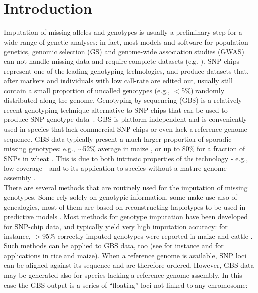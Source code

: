 \section{Introduction}
\label{intro}

Imputation of missing alleles and genotypes is usually a preliminary step for
a wide range of genetic analyses: in fact, most models and software for 
population genetics, genomic selection (GS) and genome-wide association 
studies (GWAS) can not handle missing data and require complete datasets (e.g. \cite{hayes2009invited}). 
SNP-chips represent one of the leading genotyping technologies, and produce 
datasets that, after markers and individuals with low call-rate are edited out, 
usually still contain a small proportion of uncalled genotypes (e.g., $<$5\%) 
randomly distributed along the genome. Genotyping-by-sequencing (GBS) is a 
relatively recent genotyping technique alternative to SNP-chips that can 
be used to produce SNP genotype data~\cite{elshire_robust_2011}.
GBS is platform-independent and is conveniently 
used in species that lack commercial SNP-chips or even lack a reference 
genome sequence. GBS data typically present a much larger proportion of 
sporadic missing genotypes: e.g., $\sim$52\% average in maize \cite{crossa_genomic_2013},
or up to 80\% for a fraction of SNPs in wheat \cite{poland_genomic_2012}. This 
is due to both intrinsic properties of the technology - e.g., low coverage - 
and to its application to species without a mature genome assembly \cite{glaubitz_tassel-gbs:_2014}.\\
There are several methods that are routinely used for the imputation of 
missing genotypes. Some rely solely on genotypic information, some make 
use also of genealogies, most of them are based on reconstructing haplotypes 
to be used in predictive models \cite{nicolazzi_software_2015}. Most methods for 
genotype imputation have been developed for SNP-chip data, and typically 
yield very high imputation accuracy: for instance, $>$95\% correctly imputed 
genotypes were reported in maize \cite{hickey_factors_2012} and cattle \cite{vanraden_genomic_2011}. 
Such methods can be applied to GBS data, too (see for instance 
\cite{huang_efficient_2014} and \cite{swarts_novel_2014} 
for applications in rice and maize). When a reference 
genome is available, SNP loci can be aligned against its sequence and 
are therefore ordered. However, GBS data may be generated 
also for species lacking a reference genome assembly. In this case the 
GBS output is a series of ``floating'' loci not linked to any chromosome: 
